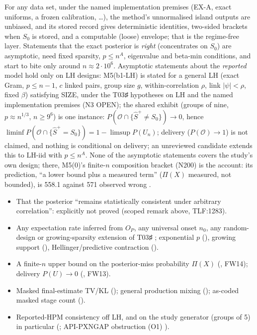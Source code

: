 \begin{plain}
For any data set, under the named implementation premises (EX-A, exact uniforms, a frozen calibration, \ldots), the method's unnormalised island outputs are unbiased, and its stored record gives deterministic identities, two-sided brackets when $S_0$ is stored, and a computable (loose) envelope; that is the regime-free layer. Statements that the exact posterior is \emph{right} (concentrates on $S_0$) are asymptotic, need fixed sparsity, $p\le n^A$, eigenvalue and beta-min conditions, and start to bite only around $n\approx2\cdot10^6$. Asymptotic statements about the \emph{reported} model hold only on LH designs: M5(b1-LH) is stated for a general LH (exact Gram, $p\le n-1$, $c$ linked pairs, group size $g$, within-correlation $\rho$, link $|\psi|<\rho$, fixed $\beta$) satisfying SIZE, under the T03♯ hypotheses on LH and the named implementation premises (N3 OPEN); the shared exhibit (groups of nine, $p\approx n^{1/3}$, $n\ge9^6$) is one instance: $P(\mathcal{O}\cap\{\hat{S}^{+}\neq S_0\})\to0$, hence $\liminf P(\mathcal{O}\cap\{\hat{S}^{+}=S_0\})=1-\limsup P(U_n)$; delivery ($P(\mathcal{O})\to1$) is not claimed, and nothing is conditional on delivery; an unreviewed candidate extends this to LH-iid with $p\le n^A$. None of the asymptotic statements covers the study's own design; there, M5(0)'s finite-$n$ composition bracket (N200) is the account: its prediction, ``a lower bound plus a measured term'' ($\Pi(X)$ measured, not bounded), is 558.1 against 571 observed wrong .
\end{plain}

\begin{notproved}[consistency]
\begin{itemize}
\item That the posterior ``remains statistically consistent under arbitrary correlation'': explicitly not proved (scoped remark above, TLF:1283).
\item Any expectation rate inferred from $O_P$, any universal onset $n_0$, any random-design or growing-sparsity extension of T03♯ ; exponential $p$ (), growing support (), Hellinger/predictive contraction ().
\item A finite-$n$ upper bound on the posterior-miss probability $\Pi(X)$ (, FW14); delivery $P(U)\to0$ (, FW13).
\item Masked final-estimate TV/KL (); general production mixing (); as-coded masked stage count ().
\item Reported-HPM consistency off LH, and on the study generator (groups of 5) in particular (; API-PXNGAP obstruction (O1) ).
\end{itemize}
\end{notproved}

